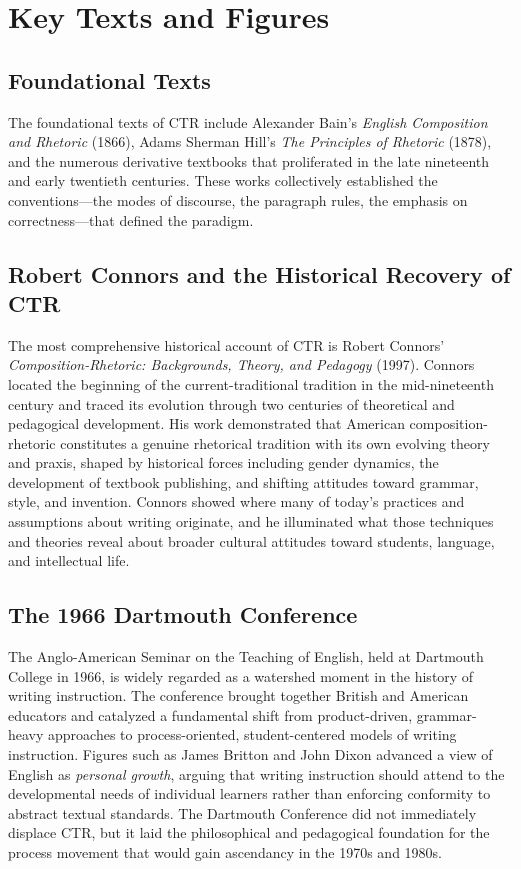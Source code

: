 \documentclass[12pt]{article}
\begin{document}
\section{Key Texts and Figures}

\subsection{Foundational Texts}

The foundational texts of CTR include Alexander Bain's \textit{English Composition and Rhetoric} (1866), Adams Sherman Hill's \textit{The Principles of Rhetoric} (1878), and the numerous derivative textbooks that proliferated in the late nineteenth and early twentieth centuries. These works collectively established the conventions---the modes of discourse, the paragraph rules, the emphasis on correctness---that defined the paradigm.

\subsection{Robert Connors and the Historical Recovery of CTR}

The most comprehensive historical account of CTR is Robert Connors' \textit{Composition-Rhetoric: Backgrounds, Theory, and Pedagogy} (1997). Connors located the beginning of the current-traditional tradition in the mid-nineteenth century and traced its evolution through two centuries of theoretical and pedagogical development. His work demonstrated that American composition-rhetoric constitutes a genuine rhetorical tradition with its own evolving theory and praxis, shaped by historical forces including gender dynamics, the development of textbook publishing, and shifting attitudes toward grammar, style, and invention. Connors showed where many of today's practices and assumptions about writing originate, and he illuminated what those techniques and theories reveal about broader cultural attitudes toward students, language, and intellectual life.

\subsection{The 1966 Dartmouth Conference}

The Anglo-American Seminar on the Teaching of English, held at Dartmouth College in 1966, is widely regarded as a watershed moment in the history of writing instruction. The conference brought together British and American educators and catalyzed a fundamental shift from product-driven, grammar-heavy approaches to process-oriented, student-centered models of writing instruction. Figures such as James Britton and John Dixon advanced a view of English as \textit{personal growth}, arguing that writing instruction should attend to the developmental needs of individual learners rather than enforcing conformity to abstract textual standards. The Dartmouth Conference did not immediately displace CTR, but it laid the philosophical and pedagogical foundation for the process movement that would gain ascendancy in the 1970s and 1980s.
\end{document}
